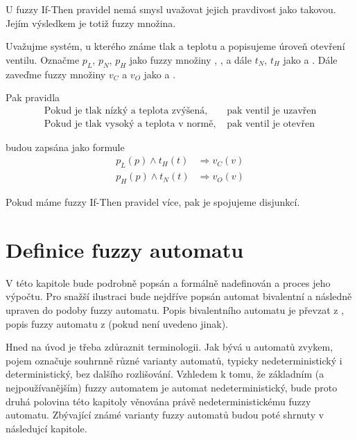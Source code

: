 \documentclass[a4paper,10pt]{article}
\begin{document}
U fuzzy If-Then pravidel nemá smysl uvažovat jejich pravdivost jako takovou. Jejím výsledkem je totiž fuzzy množina.

\begin{example}
 Uvažujme systém, u kterého známe tlak a teplotu a popisujeme úroveň otevření ventilu. Označme $p_L$, $p_N$, $p_H$ jako fuzzy množiny , ,  a dále $t_N$, $t_H$ jako  a . Dále zaveďme fuzzy množiny $v_C$ a $v_O$ jako  a . 
 
 Pak pravidla
 \begin{align*}
  \text{Pokud je tlak nízký a teplota zvýšená, }&\text{pak ventil je uzavřen} \\
  \text{Pokud je tlak vysoký a teplota v normě, }&\text{pak ventil je otevřen}
 \end{align*}

 budou zapsána jako formule
 \begin{align*}
  p_L(p) \wedge t_H(t) &\Rightarrow v_C(v) \\
  p_H(p) \wedge t_N(t) &\Rightarrow v_O(v)
 \end{align*}
\end{example}

\begin{note}
 Pokud máme fuzzy If-Then pravidel více, pak je spojujeme disjunkcí.
\end{note}


\section{Definice fuzzy automatu}
V této kapitole bude podrobně popsán a formálně nadefinován  a proces jeho výpočtu. Pro snažší ilustraci bude nejdříve popsán automat bivalentní a následně upraven do podoby fuzzy automatu. Popis bivalentního automatu je převzat z \cite{HopUl-IntrAutTheLangComp}, popis fuzzy automatu z \cite{GonGar-FuzzLangInfRanAccGuzzAutPumLemDetProc} (pokud není uvedeno jinak).

Hned na úvod je třeba zdůraznit terminologii. Jak bývá u automatů zvykem, pojem  označuje souhrnně různé varianty automatů, typicky nedeterministický i deterministický, bez dalšího rozlišování. Vzhledem k tomu, že základním (a nejpoužívanějším) fuzzy automatem je automat nedeterministický, bude proto druhá polovina této kapitoly věnována právě nedeterministickému fuzzy automatu. Zbývající známé varianty fuzzy automatů budou poté shrnuty v následujcí kapitole.
\end{document}
